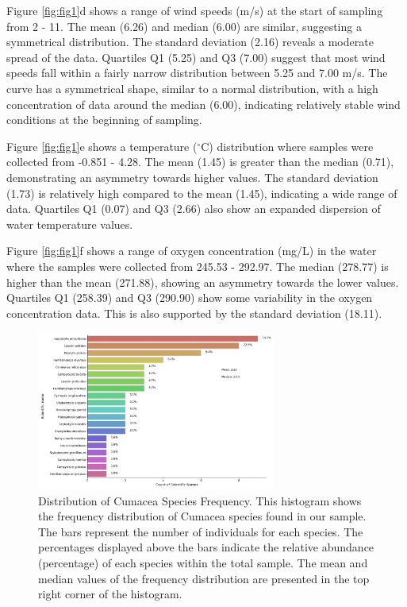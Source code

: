 Figure \ref{fig:fig1}d shows a range of wind speeds (m/s) at the start of sampling from 2 - 11. The mean (6.26) and median (6.00) are similar, suggesting a symmetrical distribution. The standard deviation (2.16) reveals a moderate spread of the data. Quartiles Q1 (5.25) and Q3 (7.00) suggest that most wind speeds fall within a fairly narrow distribution between 5.25 and 7.00 m/s. The curve has a symmetrical shape, similar to a normal distribution, with a high concentration of data around the median (6.00), indicating relatively stable wind conditions at the beginning of sampling. 

Figure \ref{fig:fig1}e shows a temperature ($^\circ$C) distribution where samples were collected from -0.851 - 4.28. The mean (1.45) is greater than the median (0.71), demonstrating an asymmetry towards higher values. The standard deviation (1.73) is relatively high compared to the mean (1.45), indicating a wide range of data. Quartiles Q1 (0.07) and Q3 (2.66) also show an expanded dispersion of water temperature values.

Figure \ref{fig:fig1}f shows a range of oxygen concentration (mg/L) in the water where the samples were collected from 245.53 - 292.97. The median (278.77) is higher than the mean (271.88), showing an asymmetry towards the lower values. Quartiles Q1 (258.39) and Q3 (290.90) show some variability in the oxygen concentration data. This is also supported by the standard deviation (18.11).

\begin{figure}[htbp]
    \centering
    \includegraphics[width=0.7\textwidth]{figure2.jpg}
    \caption{Distribution of Cumacea Species Frequency. This histogram shows the frequency distribution of Cumacea species found in our sample. The bars represent the number of individuals for each species. The percentages displayed above the bars indicate the relative abundance (percentage) of each species within the total sample. The mean and median values of the frequency distribution are presented in the top right corner of the histogram. \label{fig:fig2}}
\end{figure}

